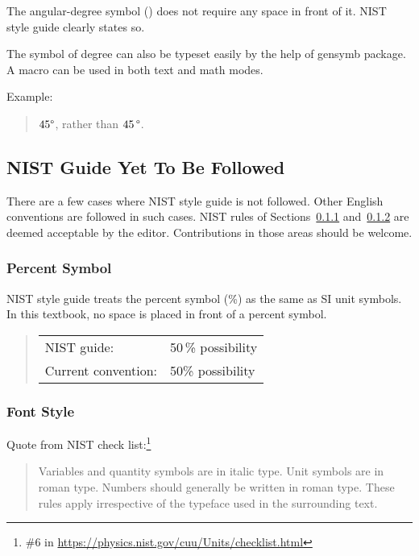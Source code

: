 The angular-degree symbol (\degree) does not require any space in front
of it. NIST style guide clearly states so.

The symbol of degree can also be typeset easily by the help of gensymb
package.
A macro \qco{\\degree} can be used in both text and math modes.

Example:

\begin{quote}
  $45\degree$, rather than $45\,\degree$.
\end{quote}

\subsection{NIST Guide Yet To Be Followed}
\label{sec:app:styleguide:NIST Guides Yet To Be Followed}

There are a few cases where NIST style guide is not followed.
Other English conventions are followed in such cases.
NIST rules of
Sections~\ref{sec:app:styleguide:Percent Symbol}
and~\ref{sec:app:styleguide:Font Style}
are deemed acceptable by the editor.
Contributions in those areas should be welcome.

\subsubsection{Percent Symbol}
\label{sec:app:styleguide:Percent Symbol}

NIST style guide treats the percent symbol (\%) as the same as SI unit
symbols.
In this textbook, no space is placed in front of a percent symbol.

\begin{quote}
\begin{tabular}{ll}
  NIST guide:& 50\,\% possibility\\
  Current convention:& 50\% possibility\\
\end{tabular}
\end{quote}

\subsubsection{Font Style}
\label{sec:app:styleguide:Font Style}

Quote from NIST check list:\footnote{
  \#6 in \url{https://physics.nist.gov/cuu/Units/checklist.html}
}

\begin{quote}
  Variables and quantity symbols are in italic type. Unit symbols
  are in roman type. Numbers should generally be written in roman
  type. These rules apply irrespective of the typeface used in
  the surrounding text.
\end{quote}

